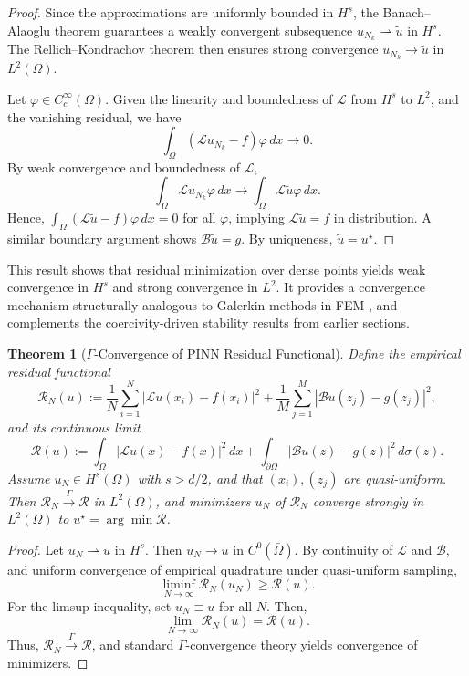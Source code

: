 \documentclass[11pt, a4paper]{article}
\newtheorem{thm}{Theorem}
\begin{document}
\begin{proof}
Since the approximations are uniformly bounded in $H^s$, the Banach–Alaoglu theorem guarantees a weakly convergent subsequence $u_{N_k} \rightharpoonup \tilde{u}$ in $H^s$. The Rellich–Kondrachov theorem then ensures strong convergence $u_{N_k} \to \tilde{u}$ in $L^2(\Omega)$.

Let $\varphi \in C_c^\infty(\Omega)$. Given the linearity and boundedness of $\mathcal{L}$ from $H^s$ to $L^2$, and the vanishing residual, we have
\[
\int_\Omega (\mathcal{L} u_{N_k} - f)\varphi \, dx \to 0.
\]
By weak convergence and boundedness of $\mathcal{L}$,
\[
\int_\Omega \mathcal{L} u_{N_k} \varphi \, dx \to \int_\Omega \mathcal{L} \tilde{u} \varphi \, dx.
\]
Hence, $\int_\Omega (\mathcal{L} \tilde{u} - f)\varphi\, dx = 0$ for all $\varphi$, implying $\mathcal{L} \tilde{u} = f$ in distribution. A similar boundary argument shows $\mathcal{B} \tilde{u} = g$. By uniqueness, $\tilde{u} = u^\star$.
\end{proof}

\vspace{1em}
This result shows that residual minimization over dense points yields weak convergence in $H^s$ and strong convergence in $L^2$. It provides a convergence mechanism structurally analogous to Galerkin methods in FEM \cite{babuvska1971error, braess2007}, and complements the coercivity-driven stability results from earlier sections.

\begin{thm}[$\Gamma$-Convergence of PINN Residual Functional]
\label{thm:gamma}
Define the empirical residual functional
\[
\mathcal{R}_N(u) := \frac{1}{N} \sum_{i=1}^N |\mathcal{L}u(x_i) - f(x_i)|^2 + \frac{1}{M} \sum_{j=1}^M |\mathcal{B}u(z_j) - g(z_j)|^2,
\]
and its continuous limit
\[
\mathcal{R}(u) := \int_\Omega |\mathcal{L}u(x) - f(x)|^2\, dx + \int_{\partial\Omega} |\mathcal{B}u(z) - g(z)|^2\, d\sigma(z).
\]
Assume $u_N \in H^s(\Omega)$ with $s > d/2$, and that $(x_i), (z_j)$ are quasi-uniform. Then $\mathcal{R}_N \xrightarrow{\Gamma} \mathcal{R}$ in $L^2(\Omega)$, and minimizers $u_N$ of $\mathcal{R}_N$ converge strongly in $L^2(\Omega)$ to $u^\star = \arg\min \mathcal{R}$.
\end{thm}

\begin{proof}
Let $u_N \rightharpoonup u$ in $H^s$. Then $u_N \to u$ in $C^0(\bar{\Omega})$. By continuity of $\mathcal{L}$ and $\mathcal{B}$, and uniform convergence of empirical quadrature under quasi-uniform sampling,
\[
\liminf_{N \to \infty} \mathcal{R}_N(u_N) \geq \mathcal{R}(u).
\]
For the limsup inequality, set $u_N \equiv u$ for all $N$. Then,
\[
\lim_{N \to \infty} \mathcal{R}_N(u) = \mathcal{R}(u).
\]
Thus, $\mathcal{R}_N \xrightarrow{\Gamma} \mathcal{R}$, and standard $\Gamma$-convergence theory yields convergence of minimizers.
\end{proof}
\end{document}
